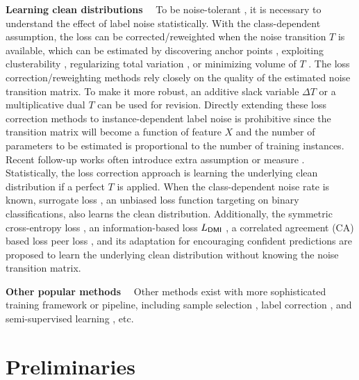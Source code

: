 \documentclass[final]{cvpr}
\begin{document}
\noindent\textbf{Learning clean distributions}~~
To be noise-tolerant \cite{manwani2013noise}, it is necessary to understand the effect of label noise statistically.
With the class-dependent assumption, the loss can be corrected/reweighted when the noise transition $T$ is available, which can be estimated by discovering anchor points \cite{liu2015classification,patrini2017making,xia2020extended}, exploiting clusterability \cite{zhu2021clusterability}, regularizing total variation \cite{zhang2021learning}, or minimizing volume of $T$ \cite{li2021provably}.
The loss correction/reweighting methods rely closely on the quality of the estimated noise transition matrix.
To make it more robust, an additive slack variable $\Delta T$ \cite{xia2019anchor} or a multiplicative dual $T$ \cite{dualT2020nips} can be used for revision.
Directly extending these loss correction methods to instance-dependent label noise is prohibitive since the transition matrix will become a function of feature $X$ and the number of parameters to be estimated is proportional to the number of training instances. 
Recent follow-up works often introduce extra assumption \cite{xia2020parts} or measure  \cite{berthon2020confidence}.
Statistically, the loss correction approach is learning the underlying clean distribution if a perfect $T$ is applied. 
When the class-dependent noise rate is known, surrogate loss \cite{natarajan2013learning}, an unbiased loss function targeting on binary classifications, also learns the clean distribution.
Additionally, the symmetric cross-entropy loss \cite{wang2019symmetric}, an information-based loss $L_{\sf DMI}$ \cite{xu2019l_dmi}, a correlated agreement (CA) based loss peer loss \cite{liu2019peer}, and its adaptation for encouraging confident predictions \cite{sieve2020} are proposed to learn the underlying clean distribution without knowing the noise transition matrix.



\noindent\textbf{Other popular methods}~~
Other methods exist with more sophisticated training framework or pipeline, including sample selection \cite{sieve2020,han2018co,jiang2017mentornet,lee2018cleannet,wei2020combating,yu2019does,yao2020searching}, label correction \cite{han2019deep,li2017learning,veit2017learning}, and semi-supervised learning \cite{Li2020DivideMix,nguyen2019self}, etc.





 \section{Preliminaries}\label{Sec:pre}
\end{document}
